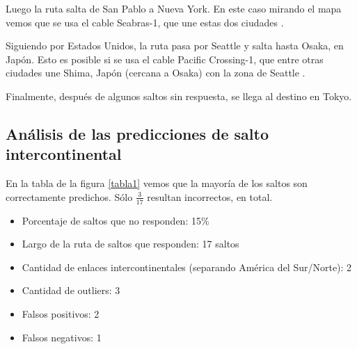 Luego la ruta salta de San Pablo a Nueva York. En este caso mirando el mapa \cite{cables} vemos que se usa el cable Seabras-1, que une estas dos ciudades \cite{seabras1}.

Siguiendo por Estados Unidos, la ruta pasa por Seattle y salta hasta Osaka, en Japón. Esto es posible si se usa el cable Pacific Crossing-1, que entre otras ciudades une Shima, Japón (cercana a Osaka) con la zona de Seattle \cite{pc1}.

Finalmente, después de algunos saltos sin respuesta, se llega al destino en Tokyo.

\subsection{Análisis de las predicciones de salto intercontinental}

En la tabla de la figura \ref{tabla1} vemos que la mayoría de los saltos son correctamente predichos. Sólo $\frac{3}{17}$ resultan incorrectos, en total.

\begin{itemize}
	\item Porcentaje de saltos que no responden: 15\%
	\item Largo de la ruta de saltos que responden: 17 saltos 
	\item Cantidad de enlaces intercontinentales (separando América del Sur/Norte): 2
	\item Cantidad de outliers: 3
	\item Falsos positivos: 2
	\item Falsos negativos: 1
\end{itemize}

